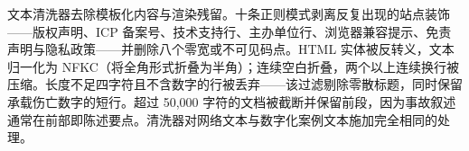 \documentclass[11pt]{article}
\begin{document}
{\cjkfont 文\allowbreak 本\allowbreak 清\allowbreak 洗\allowbreak 器\allowbreak 去\allowbreak 除\allowbreak 模\allowbreak 板\allowbreak 化\allowbreak 内\allowbreak 容\allowbreak 与\allowbreak 渲\allowbreak 染\allowbreak 残\allowbreak 留\allowbreak 。\allowbreak 十\allowbreak 条\allowbreak 正\allowbreak 则\allowbreak 模\allowbreak 式\allowbreak 剥\allowbreak 离\allowbreak 反\allowbreak 复\allowbreak 出\allowbreak 现\allowbreak 的\allowbreak 站\allowbreak 点\allowbreak 装\allowbreak 饰}------{\cjkfont 版\allowbreak 权\allowbreak 声\allowbreak 明\allowbreak 、}ICP {\cjkfont 备\allowbreak 案\allowbreak 号\allowbreak 、\allowbreak 技\allowbreak 术\allowbreak 支\allowbreak 持\allowbreak 行\allowbreak 、\allowbreak 主\allowbreak 办\allowbreak 单\allowbreak 位\allowbreak 行\allowbreak 、\allowbreak 浏\allowbreak 览\allowbreak 器\allowbreak 兼\allowbreak 容\allowbreak 提\allowbreak 示\allowbreak 、\allowbreak 免\allowbreak 责\allowbreak 声\allowbreak 明\allowbreak 与\allowbreak 隐\allowbreak 私\allowbreak 政\allowbreak 策}------{\cjkfont 并\allowbreak 删\allowbreak 除\allowbreak 八\allowbreak 个\allowbreak 零\allowbreak 宽\allowbreak 或\allowbreak 不\allowbreak 可\allowbreak 见\allowbreak 码\allowbreak 点\allowbreak 。}HTML {\cjkfont 实\allowbreak 体\allowbreak 被\allowbreak 反\allowbreak 转\allowbreak 义\allowbreak ，\allowbreak 文\allowbreak 本\allowbreak 归\allowbreak 一\allowbreak 化\allowbreak 为} NFKC{\cjkfont （\allowbreak 将\allowbreak 全\allowbreak 角\allowbreak 形\allowbreak 式\allowbreak 折\allowbreak 叠\allowbreak 为\allowbreak 半\allowbreak 角\allowbreak ）\allowbreak ；\allowbreak 连\allowbreak 续\allowbreak 空\allowbreak 白\allowbreak 折\allowbreak 叠\allowbreak ，\allowbreak 两\allowbreak 个\allowbreak 以\allowbreak 上\allowbreak 连\allowbreak 续\allowbreak 换\allowbreak 行\allowbreak 被\allowbreak 压\allowbreak 缩\allowbreak 。\allowbreak 长\allowbreak 度\allowbreak 不\allowbreak 足\allowbreak 四\allowbreak 字\allowbreak 符\allowbreak 且\allowbreak 不\allowbreak 含\allowbreak 数\allowbreak 字\allowbreak 的\allowbreak 行\allowbreak 被\allowbreak 丢\allowbreak 弃}------{\cjkfont 该\allowbreak 过\allowbreak 滤\allowbreak 剔\allowbreak 除\allowbreak 零\allowbreak 散\allowbreak 标\allowbreak 题\allowbreak ，\allowbreak 同\allowbreak 时\allowbreak 保\allowbreak 留\allowbreak 承\allowbreak 载\allowbreak 伤\allowbreak 亡\allowbreak 数\allowbreak 字\allowbreak 的\allowbreak 短\allowbreak 行\allowbreak 。\allowbreak 超\allowbreak 过} 50,000 {\cjkfont 字\allowbreak 符\allowbreak 的\allowbreak 文\allowbreak 档\allowbreak 被\allowbreak 截\allowbreak 断\allowbreak 并\allowbreak 保\allowbreak 留\allowbreak 前\allowbreak 段\allowbreak ，\allowbreak 因\allowbreak 为\allowbreak 事\allowbreak 故\allowbreak 叙\allowbreak 述\allowbreak 通\allowbreak 常\allowbreak 在\allowbreak 前\allowbreak 部\allowbreak 即\allowbreak 陈\allowbreak 述\allowbreak 要\allowbreak 点\allowbreak 。\allowbreak 清\allowbreak 洗\allowbreak 器\allowbreak 对\allowbreak 网\allowbreak 络\allowbreak 文\allowbreak 本\allowbreak 与\allowbreak 数\allowbreak 字\allowbreak 化\allowbreak 案\allowbreak 例\allowbreak 文\allowbreak 本\allowbreak 施\allowbreak 加\allowbreak 完\allowbreak 全\allowbreak 相\allowbreak 同\allowbreak 的\allowbreak 处\allowbreak 理\allowbreak 。}
\end{document}
